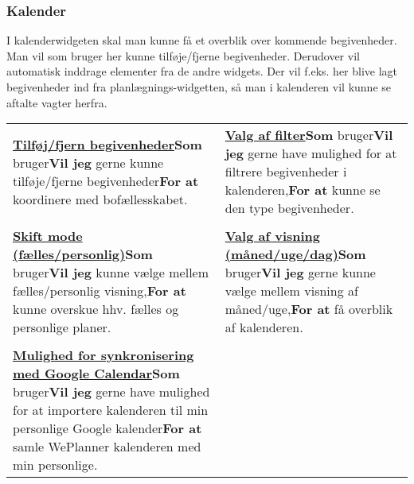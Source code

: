 \subsubsection{Kalender}

I kalenderwidgeten skal man kunne få et overblik over kommende begivenheder. Man vil som bruger her kunne tilføje/fjerne begivenheder. Derudover vil automatisk inddrage elementer fra de andre widgets. Der vil f.eks. her blive lagt begivenheder ind fra planlægnings-widgetten, så man i kalenderen vil kunne se aftalte vagter herfra.

\begin{tabular}{p{2.5in}p{2.5in}}
\textbf{\underline{Tilføj/fjern begivenheder}}\newline \textbf{Som} bruger\newline \textbf{Vil jeg} gerne kunne tilføje/fjerne begivenheder\newline \textbf{For at} koordinere med bofællesskabet. & 

\textbf{\underline{Valg af filter}}\newline \textbf{Som} bruger\newline \textbf{Vil jeg} gerne have mulighed for at filtrere begivenheder i kalenderen,\newline \textbf{For at} kunne se den type begivenheder.  \\\\

\textbf{\underline{Skift mode (fælles/personlig)}}\newline \textbf{Som} bruger\newline \textbf{Vil jeg} kunne vælge mellem fælles/personlig visning,\newline \textbf{For at} kunne overskue hhv. fælles og personlige planer.  & 

\textbf{\underline{Valg af visning (måned/uge/dag)}}\newline \textbf{Som} bruger\newline \textbf{Vil jeg} gerne kunne vælge mellem visning af måned/uge,\newline \textbf{For at} få overblik af kalenderen.  \\\\  

\textbf{\underline{Mulighed for synkronisering med Google Calendar}}\newline \textbf{Som} bruger\newline \textbf{Vil jeg} gerne have mulighed for at importere kalenderen til min personlige Google kalender\newline \textbf{For at} samle WePlanner kalenderen med min personlige.  &  \\
\end{tabular}

